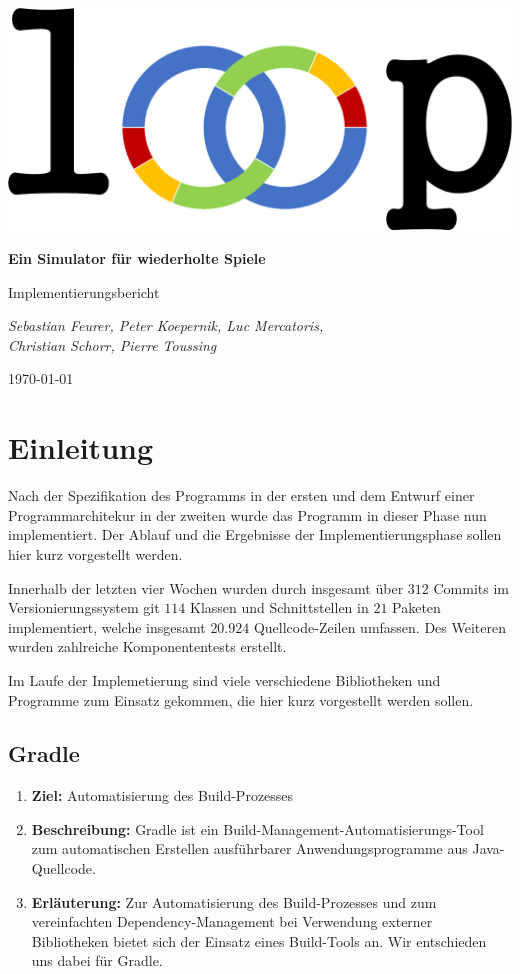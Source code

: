 \documentclass[parskip=full,11pt]{scrartcl}
\begin{document}
\begin{titlepage}
	\centering
	\vspace*{5cm}
	\includegraphics[width = 0.7\linewidth]{img/logo.png}\par
	{\huge\bfseries Ein Simulator für wiederholte Spiele\par}
	{\Large Implementierungsbericht\par}
	\vspace{2cm}
	{\Large\itshape Sebastian Feurer, Peter Koepernik, Luc Mercatoris,\\Christian Schorr, Pierre Toussing\par}
	\vfill
	{\large \today\par}
\end{titlepage}

\tableofcontents
\pagebreak

\section{Einleitung}
Nach der Spezifikation des Programms in der ersten und dem Entwurf einer Programmarchitekur in der zweiten wurde das Programm in dieser Phase nun implementiert. Der Ablauf und die Ergebnisse der Implementierungsphase sollen hier kurz vorgestellt werden.

Innerhalb der letzten vier Wochen wurden durch insgesamt über \(312\) Commits im Versionierungssystem git \(114\) Klassen und Schnittstellen in \(21\) Paketen implementiert, welche  insgesamt \(20.924\) Quellcode-Zeilen umfassen. Des Weiteren wurden zahlreiche Komponententests erstellt.

Im Laufe der Implemetierung sind viele verschiedene Bibliotheken und Programme zum Einsatz gekommen, die hier kurz vorgestellt werden sollen.

\subsection{Gradle}
\begin{enumerate}
\item[] \textbf{Ziel:} Automatisierung des Build-Prozesses
\item[] \textbf{Beschreibung:} Gradle ist ein Build-Management-Automatisierungs-Tool zum automatischen Erstellen ausführbarer Anwendungsprogramme aus Java-Quellcode.
\item[] \textbf{Erläuterung:} Zur Automatisierung des Build-Prozesses und zum vereinfachten Dependency-Management bei Verwendung externer Bibliotheken bietet sich der Einsatz eines Build-Tools an. Wir entschieden uns dabei für Gradle.
\end{enumerate}
\end{document}
